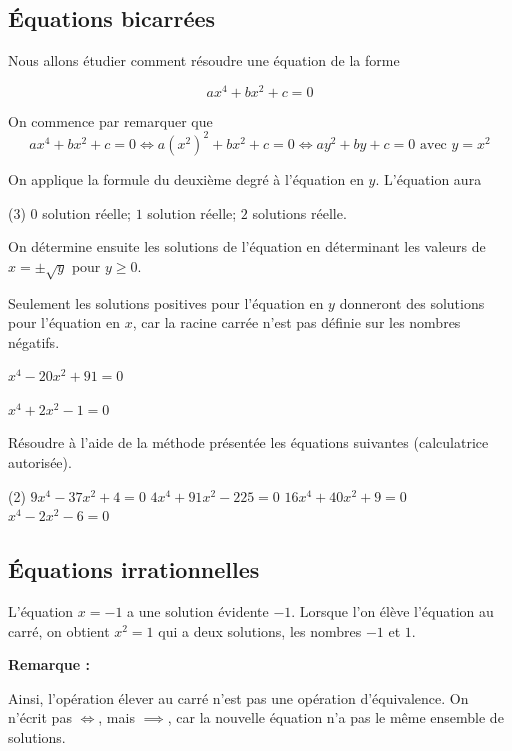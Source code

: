 \documentclass[a4paper,12pt]{article}
\begin{document}
\subsection{Équations bicarrées}
Nous allons étudier comment résoudre une équation de la forme

\[ax^4+bx^2+c=0\]

On commence par remarquer que 
\[ax^4+bx^2+c=0 \iff a(x^2)^2+bx^2+c=0 \iff ay^2+by+c=0 \text{ avec } y=x^2\]

On applique la formule du deuxième degré à l'équation en $y$. L'équation aura 
\begin{tasks}(3)
	\task[] $0$ solution réelle;
	\task[] $1$ solution réelle;
	\task[] $2$ solutions réelle.
\end{tasks}
On détermine ensuite les solutions de l'équation en déterminant les valeurs de $x=\pm\sqrt{y}$ pour $y\geq 0$.
\medskip

Seulement les solutions positives pour l'équation en $y$ donneront des solutions pour l'équation en $x$, car la racine carrée n'est pas définie sur les nombres négatifs.

\begin{exemple}
	$x^4-20x^2+91=0$
	\tcblower
\vspace{10cm}
\end{exemple}
\newpage 
\begin{exemple}
	$x^4+2x^2-1=0$
	\tcblower
\vspace{15cm}
\end{exemple}

\begin{exercice}
	Résoudre à l'aide de la méthode présentée les équations suivantes (calculatrice autorisée). 
\begin{tasks}(2)
	\task $9 x^4-37 x^2+4=0$
	\task $4 x^4+91 x^2-225=0$
	\task $16 x^4+40 x^2+9=0$
	\task $x^4-2 x^2-6=0$
\end{tasks}
\end{exercice}

\newpage
\subsection{Équations irrationnelles}
L'équation $x=-1$ a une solution évidente $-1$. Lorsque l'on élève l'équation au carré, on obtient $x^2=1$ qui a deux solutions, les nombres $-1$ et $1$. 

{\bfseries Remarque :}
\vspace{4cm}

Ainsi, l'opération \og{} élever au carré \fg{} n'est pas une opération d'équivalence. On n'écrit pas \og{}$\iff$\fg{}, mais \og{}$\implies$\fg{}, car la nouvelle équation n'a pas le même ensemble de solutions.
\end{document}
